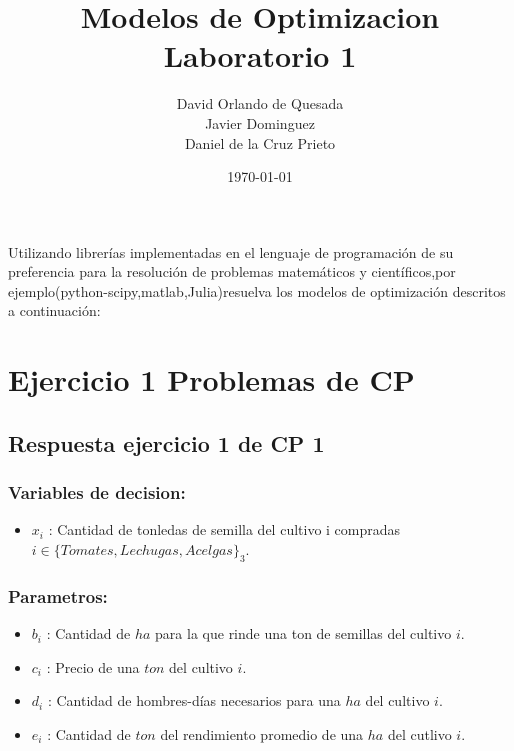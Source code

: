 \documentclass[]{article}
\begin{document}
\title{\bf  Modelos de Optimizacion Laboratorio 1}          
\author{David Orlando de Quesada \\ Javier Dominguez \\ Daniel de la Cruz Prieto   }                        
\date{\today} 

\maketitle 

Utilizando librerías implementadas en el lenguaje de programación de su preferencia para la resolución de problemas matemáticos y científicos,por ejemplo(python-scipy,matlab,Julia)resuelva los modelos de optimización descritos a continuación:


\section*{Ejercicio 1 Problemas de CP} 

 \subsection*{Respuesta ejercicio 1 de CP 1} 
 
 \subsubsection*{Variables de decision:} 
 
 \begin{itemize}
 	\item $x_i$ : Cantidad de tonledas de semilla del cultivo i compradas $i \in \{Tomates, Lechugas, Acelgas\}_3$.
 \end{itemize}
 
 
 
  \subsubsection*{Parametros:} 
 
 \begin{itemize}
 	 \item $b_i$ : Cantidad de $ha$ para la que rinde una ton de semillas del cultivo $i$.
 	
 	\item  $c_i$ : Precio de una $ton$ del cultivo $i$.
 	
 	\item  $d_i$ : Cantidad de hombres-d\'ias necesarios para una $ha$ del cultivo $i$.
 	
 	\item $e_i$ : Cantidad de $ton$ del rendimiento promedio de una $ha$ del cutlivo $i$.
 \end{itemize} 
   
\end{document}
